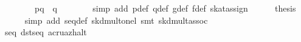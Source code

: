 \begin{isabellebody}
\ \ \isamarkupfalse%
\ {}\isanewline
\ \ \ \ \isamarkupfalse%
\ {}p{}{}{}q{}{}{}\ {}\ q{}{}{}{}\isanewline
\ \ \ \ \ \ \isamarkupfalse%
\ {}simp\ add{}\ p{}def\ q{}def\ g{}def\ f{}def\ skat{}assign{}{}\isanewline
\ \ \ \ \isamarkupfalse%
\ {}thesis\isanewline
\ \ \ \ \ \ \isamarkupfalse%
\ {}simp\ add{}\ seq{}def\ skd{}mult{}onel{}\ {}smt\ skd{}mult{}assoc{}\isanewline
\ \ \isamarkupfalse%
\isanewline
\isanewline
\ \ \isamarkupfalse%
\ \isamarkupfalse%
\ {}{}{}{}\ {}\ seq\ {}d{}s{}{}t{}{}{}seq\ {}{}a{}{}c{}{}r{}{}{}u{}{}{}{}{}a{}{}z{}{}halt{}{}\isanewline
\ \ \isamarkupfalse%
\ {}\isanewline

\end{isabellebody}
